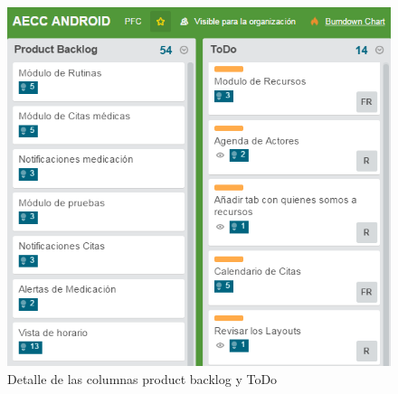 \documentclass[../pfc.tex]{subfiles}
\begin{document}
	\begin{figure}[H]
		\centering
		\includegraphics[width=0.7\linewidth]{../images/pbacklog_todo}
		\caption{Detalle de las columnas product backlog y ToDo}
		\label{fig:trelloBackDo}
	\end{figure}
	
\end{document}
